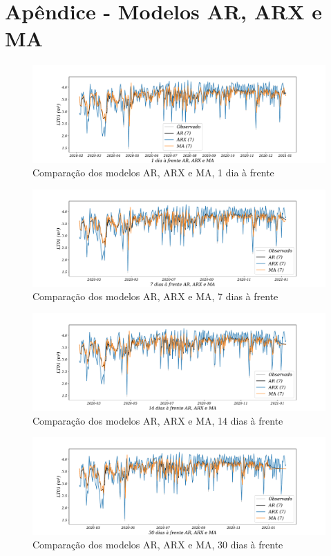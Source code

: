 
\section{Ap\^endice - Modelos AR, ARX e MA }\label{sec:ararxma24}

\begin{figure}[H]
	\centering
	\caption{Comparação dos modelos AR, ARX e MA, 1 dia à frente }
	\label{fig:1-AR-ARX-MA24}
	\includegraphics[width=1\linewidth]{Apendices/Figuras/modelagem-24h/1-AR-ARX-MA}
	

\end{figure}

\begin{figure}[H]
	\centering
	\caption{Comparação dos modelos AR, ARX e MA, 7 dias à frente }
	\label{fig:10-AR-ARX-MA24}
	\includegraphics[width=1\linewidth]{Apendices/Figuras/modelagem-24h/7-AR-ARX-MA}
	

\end{figure}


\begin{figure}[H]
	\centering
	\caption{Comparação dos modelos AR, ARX e MA, 14 dias à frente }
	\label{fig:30-AR-ARX-MA24}
	\includegraphics[width=1\linewidth]{Apendices/Figuras/modelagem-24h/14-AR-ARX-MA}
	

\end{figure}

\begin{figure}[H]
	\centering
	\caption{Comparação dos modelos AR, ARX e MA, 30 dias à frente }
	\label{fig:60-AR-ARX-MA24}
	\includegraphics[width=1\linewidth]{Apendices/Figuras/modelagem-24h/30-AR-ARX-MA}
	

\end{figure}

